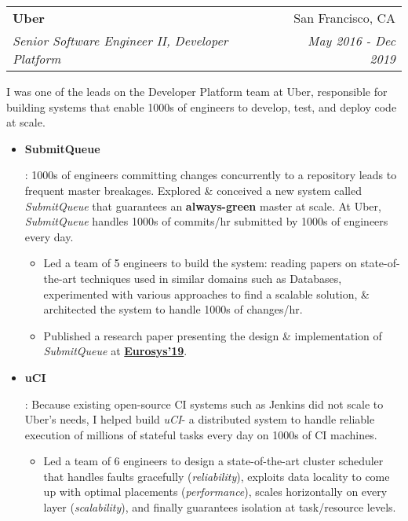 \documentclass[letterpaper,11pt]{article}
\makeatletter
\newcommand{\resumeItem}[2]{
  \item\small{
    \textbf{#1}{: #2 \vspace{-2pt}}
  }
}
\newcommand{\resumeSubheading}[4]{
  \vspace{-1pt}\item
    \begin{tabular*}{0.97\textwidth}[t]{l@{\extracolsep{\fill}}r}
      \textbf{#1} & #2 \\
      \textit{\small#3} & \textit{\small #4} \\
    \end{tabular*}\vspace{-5pt}
}
\newcommand{\resumeSubSubheading}[2]{
    \begin{tabular*}{0.97\textwidth}{l@{\extracolsep{\fill}}r}
      \textit{\small#1} & \textit{\small #2} \\
    \end{tabular*}\vspace{-5pt}
}
\newcommand{\resumeItemListStart}{\begin{itemize}}
\newcommand{\resumeItemListEnd}{\end{itemize}}
\newcommand{\sq}{\textit{SubmitQueue}\xspace}
\newcommand{\uci}{\textit{uCI}\xspace}
\newcommand{\role}[1]{
  \vspace{5pt}
  \small{#1}
  \vspace{-5pt}
}
\makeatother
\begin{document}


\resumeSubheading
{Uber}{San Francisco, CA}
{Senior Software Engineer II, Developer Platform}{May 2016 - Dec 2019}


\role{I was one of the leads on the Developer Platform team at Uber, responsible for building systems that enable 1000s of engineers to develop, test, and deploy code at scale.}
\resumeItemListStart
\resumeItem{SubmitQueue}
{
  1000s of engineers committing changes concurrently to a repository leads to frequent master breakages.
  Explored \& conceived a new system called \sq that guarantees an \textbf{always-green} master at scale. At Uber, \sq handles 1000s of commits/hr submitted by 1000s of engineers every day.
  \begin{itemize}[label=\textbf{--}]
    \item
          Led a team of 5 engineers to build the system: reading papers on state-of-the-art techniques used in similar domains such as Databases, experimented with various approaches to find a scalable solution, \& architected the system to handle 1000s of changes/hr.
    \item
          Published a research paper presenting the design \& implementation of \sq at \href{https://doi.org/10.1145/3302424.3303970}{\textbf{Eurosys'19}}.
  \end{itemize}
}
\resumeItem{uCI}
{
  Because existing open-source CI systems such as Jenkins did not scale to Uber's needs, I helped build \uci - a distributed system to handle reliable execution of millions of stateful tasks every day on 1000s of CI machines.
  \begin{itemize}[label=\textbf{--}]
    \item
          Led a team of 6 engineers to design a state-of-the-art cluster scheduler that handles faults gracefully (\textit{reliability}), exploits data locality to come up with optimal placements (\textit{performance}), scales horizontally on every layer (\textit{scalability}), and finally guarantees isolation at task/resource levels.
  \end{itemize}
}
\resumeItemListEnd
\end{document}
